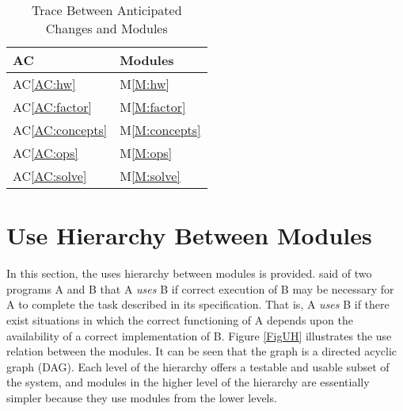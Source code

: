 \documentclass[12pt, titlepage]{article}
\newcommand{\acref}[1]{AC\ref{#1}}
\newcommand{\mref}[1]{M\ref{#1}}
\begin{document}
\begin{table}[H]
  \centering
  \begin{tabular}{p{} p{}}
    \toprule
    \textbf{AC}               & \textbf{Modules}        \\
    \midrule
    \acref{AC:hw}       & \mref{M:hw}       \\
    \acref{AC:factor}   & \mref{M:factor}   \\
    \acref{AC:concepts} & \mref{M:concepts} \\
    \acref{AC:ops}      & \mref{M:ops}      \\
    \acref{AC:solve}    & \mref{M:solve}    \\
    \bottomrule
  \end{tabular}
  \caption{Trace Between Anticipated Changes and Modules}
  \label{TblACT}
\end{table}

\section{Use Hierarchy Between Modules} \label{SecUse}

In this section, the uses hierarchy between modules is
provided. \cite{Parnas1978} said of two programs A and B that A {\em uses} B if
correct execution of B may be necessary for A to complete the task described in
its specification. That is, A {\em uses} B if there exist situations in which
the correct functioning of A depends upon the availability of a correct
implementation of B.  Figure \ref{FigUH} illustrates the use relation between
the modules. It can be seen that the graph is a directed acyclic graph
(DAG). Each level of the hierarchy offers a testable and usable subset of the
system, and modules in the higher level of the hierarchy are essentially simpler
because they use modules from the lower levels.


\end{document}
